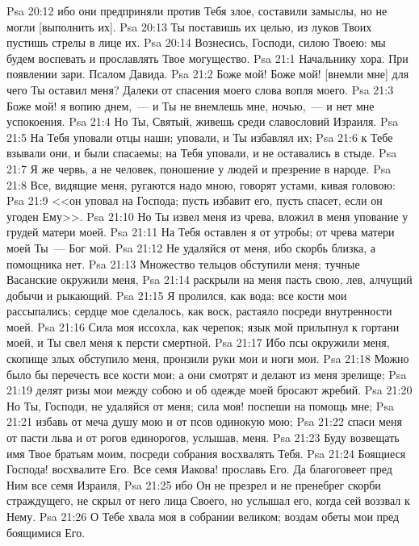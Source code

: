 \vs Psa 20:12 ибо они предприняли против Тебя злое, составили замыслы, но не могли [выполнить их].
\vs Psa 20:13 Ты поставишь их целью, из луков Твоих пустишь стрелы в лице их.
\vs Psa 20:14 Вознесись, Господи, силою Твоею: мы будем воспевать и прославлять Твое могущество.
\vs Psa 21:1 Начальнику хора. При появлении зари. Псалом Давида.
\rsbpar\vs Psa 21:2 Боже мой! Боже мой! [внемли мне] для чего Ты оставил меня? Далеки от спасения моего слова вопля моего.
\vs Psa 21:3 Боже мой! я вопию днем,~--- и Ты не внемлешь мне, ночью,~--- и нет мне успокоения.
\vs Psa 21:4 Но Ты, Святый, живешь среди славословий Израиля.
\vs Psa 21:5 На Тебя уповали отцы наши; уповали, и Ты избавлял их;
\vs Psa 21:6 к Тебе взывали они, и были спасаемы; на Тебя уповали, и не оставались в стыде.
\vs Psa 21:7 Я же червь, а не человек, поношение у людей и презрение в народе.
\vs Psa 21:8 Все, видящие меня, ругаются надо мною, говорят устами, кивая головою:
\vs Psa 21:9 <<он уповал на Господа; пусть избавит его, пусть спасет, если он угоден Ему>>.
\vs Psa 21:10 Но Ты извел меня из чрева, вложил в меня упование у грудей матери моей.
\vs Psa 21:11 На Тебя оставлен я от утробы; от чрева матери моей Ты~--- Бог мой.
\vs Psa 21:12 Не удаляйся от меня, ибо скорбь близка, а помощника нет.
\vs Psa 21:13 Множество тельцов обступили меня; тучные Васанские окружили меня,
\vs Psa 21:14 раскрыли на меня пасть свою,  лев, алчущий добычи и рыкающий.
\vs Psa 21:15 Я пролился, как вода; все кости мои рассыпались; сердце мое сделалось, как воск, растаяло посреди внутренности моей.
\vs Psa 21:16 Сила моя иссохла, как черепок; язык мой прильпнул к гортани моей, и Ты свел меня к персти смертной.
\vs Psa 21:17 Ибо псы окружили меня, скопище злых обступило меня, пронзили руки мои и ноги мои.
\vs Psa 21:18 Можно было бы перечесть все кости мои; а они смотрят и делают из меня зрелище;
\vs Psa 21:19 делят ризы мои между собою и об одежде моей бросают жребий.
\vs Psa 21:20 Но Ты, Господи, не удаляйся от меня; сила моя! поспеши на помощь мне;
\vs Psa 21:21 избавь от меча душу мою и от псов одинокую мою;
\vs Psa 21:22 спаси меня от пасти льва и от рогов единорогов, услышав,  меня.
\vs Psa 21:23 Буду возвещать имя Твое братьям моим, посреди собрания восхвалять Тебя.
\vs Psa 21:24 Боящиеся Господа! восхвалите Его. Все семя Иакова! прославь Его. Да благоговеет пред Ним все семя Израиля,
\vs Psa 21:25 ибо Он не презрел и не пренебрег скорби страждущего, не скрыл от него лица Своего, но услышал его, когда сей воззвал к Нему.
\vs Psa 21:26 О Тебе хвала моя в собрании великом; воздам обеты мои пред боящимися Его.
